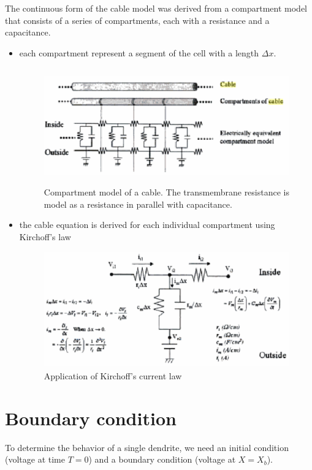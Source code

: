 The continuous form of the cable model was derived from a compartment
model that consists of a series of compartments, each with a
resistance and a capacitance. 
\begin{itemize}
\item each compartment represent a segment of the cell with a length
  $\Delta x$.
\begin{figure}[hbt]
 \centerline{\includegraphics[height=5cm, angle=0]{./images/compartment_model.eps}}
\caption{Compartment model of a cable. The transmembrane resistance is
model as a resistance in parallel with capacitance.}
\label{fig:compartment_model}
\end{figure}

\item the cable equation is derived for each individual compartment
  using Kirchoff's law
\begin{figure}[hbt]
 \centerline{\includegraphics[height=5cm, angle=0]{./images/cable_equation.eps}}
\caption{Application of Kirchoff's current law}
\label{fig:cable_equation}
\end{figure}

\end{itemize}


\section{Boundary condition}
\label{sec:boundary-condition}

To determine the behavior of a single dendrite, we need an initial
condition (voltage at time $T=0$) and a boundary condition (voltage at
$X=X_b$).


